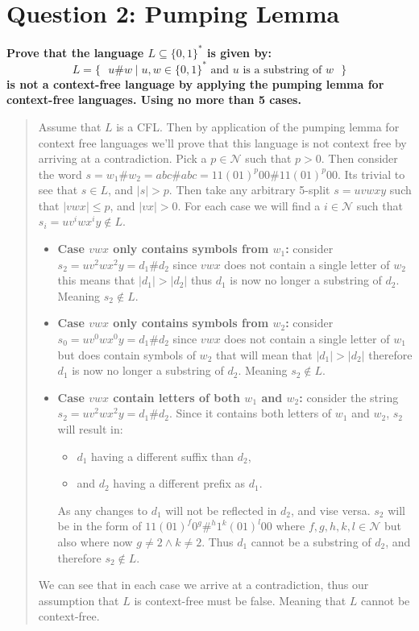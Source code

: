 \section*{Question 2: Pumping Lemma}
    \textbf{Prove that the language $L \subseteq \{0,1\}^\ast$ is given by:}
    \begin{displaymath} %
        L = \{\text{ }
            u\#w  \mid u, w \in \{0, 1\}^* \text{ and } u \text{ is a substring of } w
        \text{ }\}
    \end{displaymath}
    \textbf{is not a context-free language by applying the pumping lemma for context-free languages. Using no more than 5 cases.}
    \medskip
    \begin{quote}
        Assume that $L$ is a CFL. Then by application of the pumping lemma for context free languages we'll prove that this language is not context free by arriving at a contradiction. Pick a $p\in\mathcal{N}$ such that $p > 0$. Then consider the word $s = w_1\#w_2 = abc\#abc = 11(01)^p00\#11(01)^p00$. Its trivial to see that $s\in L$, and $|s| > p$. Then take any arbitrary 5-split $s = uvwxy$ such that $|vwx| \leqslant p$, and $|vx| > 0$. For each case we will find a $i\in \mathcal{N}$ such that $s_i = uv^iwx^iy \not\in L$.
        \begin{itemize}
            \item \textbf{Case $vwx$ only contains symbols from $w_1$:} consider $s_2 = uv^2wx^2y = d_1\#d_2$ since $vwx$ does not contain a single letter of $w_2$ this means that $|d_1| > |d_2|$ thus $d_1$ is now no longer a substring of $d_2$. Meaning $s_2 \not\in L$.
            \item \textbf{Case $vwx$ only contains symbols from $w_2$:} consider $s_0 = uv^0wx^0y = d_1\#d_2$ since $vwx$ does not contain a single letter of $w_1$ but does contain symbols of $w_2$ that will mean that $|d_1| > |d_2|$ therefore $d_1$ is now no longer a substring of $d_2$. Meaning $s_2 \not\in L$.
            \item \textbf{Case $vwx$ contain letters of both $w_1$ and $w_2$:} consider the string $s_2 = uv^2wx^2y = d_1\#d_2$. Since it contains both letters of $w_1$ and $w_2$, $s_2$ will result in:
            \begin{itemize}
                \item $d_1$ having a different suffix than $d_2$,
                \item and $d_2$ having a different prefix as $d_1$.
            \end{itemize}
            As any changes to $d_1$ will not be reflected in $d_2$, and vise versa. $s_2$ will be in the form of $11(01)^f0^g\#^h1^k(01)^l00$ where $f, g, h, k, l \in\mathcal{N}$ but also where now $g\neq 2 \wedge k\neq2$. Thus $d_1$ cannot be a substring of $d_2$, and therefore $s_2\not\in L$.
        \end{itemize}
        We can see that in each case we arrive at a contradiction, thus our assumption that $L$ is context-free must be false. Meaning that $L$ cannot be context-free.
    \end{quote}
\newpage
